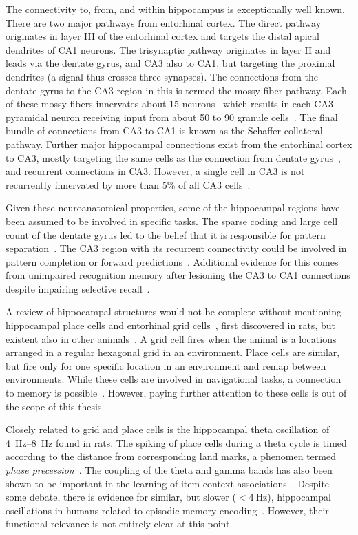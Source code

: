 The connectivity to, from, and within hippocampus is exceptionally well known.
There are two major pathways from entorhinal cortex.
The direct pathway originates in layer III of the entorhinal cortex and targets the distal apical dendrites of CA1 neurons.
The trisynaptic pathway originates in layer II and leads via the dentate gyrus, and CA3 also to CA1, but targeting the proximal dendrites (a signal thus crosses three synapses).
The connections from the dentate gyrus to the CA3 region in this is termed the mossy fiber pathway.
Each of these mossy fibers innervates about 15 neurons~\parencite{Claiborne1986} which results in each CA3 pyramidal neuron receiving input from about 50 to 90 granule cells~\parencite[230]{Squire1989}.
The final bundle of connections from CA3 to CA1 is known as the Schaffer collateral pathway.
Further major hippocampal connections exist from the entorhinal cortex to CA3, mostly targeting the same cells as the connection from dentate gyrus~\parencite{Paxinos2014}, and recurrent connections in CA3.
However, a single cell in CA3 is not recurrently innervated by more than 5\% of all CA3 cells~\parencite[231]{Squire1989}.

Given these neuroanatomical properties, some of the hippocampal regions have been assumed to be involved in specific tasks.
The sparse coding and large cell count of the dentate gyrus led to the belief that it is responsible for pattern separation~\parencite{Rolls2013}.
The CA3 region with its recurrent connectivity could be involved in pattern completion or forward predictions~\parencite{Guzowski2004,Leutgeb2007,Rolls2013}.
Additional evidence for this comes from unimpaired recognition memory after lesioning the CA3 to CA1 connections despite impairing selective recall~\parencite{Brun2002}. 

A review of hippocampal structures would not be complete without mentioning hippocampal place cells and entorhinal grid cells~\parencite{hafting2005}, first discovered in rats, but existent also in other animals~\parencite{buzsaki2013}.
A grid cell fires when the animal is a locations arranged in a regular hexagonal grid in an environment.
Place cells are similar, but fire only for one specific location in an environment and remap between environments.
While these cells are involved in navigational tasks, a connection to memory is possible~\parencite{buzsaki2013}.
However, paying further attention to these cells is out of the scope of this thesis.

Closely related to grid and place cells is the hippocampal theta oscillation of \SIrange{4}{8}{\hertz} found in rats.
The spiking of place cells during a theta cycle is timed according to the distance from corresponding land marks, a phenomen termed \emph{phase precession}~\parencite{okeefe1993}.
The coupling of the theta and gamma bands has also been shown to be important in the learning of item-context associations~\parencite{tort2009}.
Despite some debate, there is evidence for similar, but slower ($<\SI{4}{\hertz}$), hippocampal oscillations in humans related to episodic memory encoding~\parencite{lega2012}.
However, their functional relevance is not entirely clear at this point.

